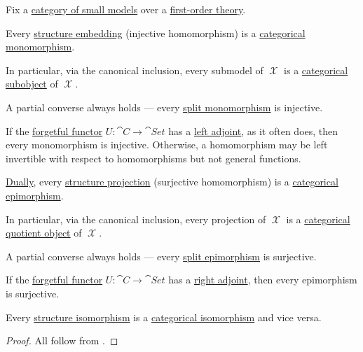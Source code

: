 \begin{proposition}\label{thm:first_order_categorical_invertibility}
  Fix a \hyperref[def:category_of_small_first_order_models]{category of small models} over a \hyperref[def:first_order_theory]{first-order theory}.

  \begin{thmenum}
     Every \hyperref[def:multi_valued_function/empty]{} \hyperref[def:first_order_homomorphism_invertibility/embedding]{structure embedding} (injective homomorphism) is a \hyperref[def:morphism_invertibility/left_cancellative]{categorical monomorphism}.

    In particular, via the canonical inclusion, every submodel of \( \mscrX \) is a \hyperref[def:subobject_and_quotient]{categorical subobject} of \( \mscrX \).

    A partial converse always holds --- every \hyperref[def:morphism_invertibility/left_cancellative]{split monomorphism} is injective.

    If the \hyperref[def:concrete_category]{forgetful functor} \( U: \cat{C} \to \cat{Set} \) has a \hyperref[def:category_adjunction]{left adjoint}, as it often does, then every monomorphism is injective. Otherwise, a homomorphism may be left invertible with respect to homomorphisms but not general functions.

     \hyperref[thm:categorical_principle_of_duality]{Dually}, every \hyperref[def:first_order_homomorphism_invertibility/projection]{structure projection} (surjective homomorphism) is a \hyperref[def:morphism_invertibility/right_cancellative]{categorical epimorphism}.

    In particular, via the canonical inclusion, every projection of \( \mscrX \) is a \hyperref[def:subobject_and_quotient]{categorical quotient object} of \( \mscrX \).

    A partial converse always holds --- every \hyperref[def:morphism_invertibility/right_cancellative]{split epimorphism} is surjective.

    If the \hyperref[def:concrete_category]{forgetful functor} \( U: \cat{C} \to \cat{Set} \) has a \hyperref[def:category_adjunction]{right adjoint}, then every epimorphism is surjective.

     Every \hyperref[def:first_order_homomorphism_invertibility/isomorphism]{structure isomorphism} is a \hyperref[def:morphism_invertibility/isomorphism]{categorical isomorphism} and vice versa.
  \end{thmenum}
\end{proposition}
\begin{proof}
  All follow from .
\end{proof}

